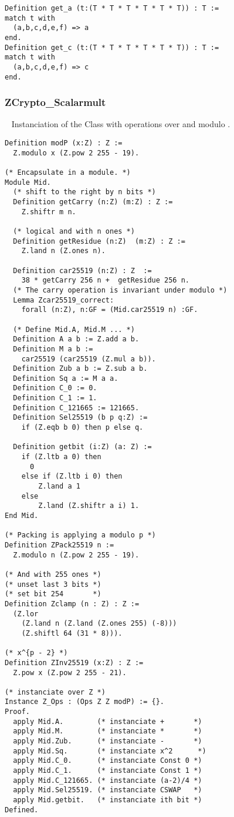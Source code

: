 \begin{lstlisting}[language=Coq]
Definition get_a (t:(T * T * T * T * T * T)) : T :=
match t with
  (a,b,c,d,e,f) => a
end.
Definition get_c (t:(T * T * T * T * T * T)) : T :=
match t with
  (a,b,c,d,e,f) => c
end.
\end{lstlisting}

\subsubsection{ZCrypto\_Scalarmult}
\label{subsubsec:ZCryptoScalarmult}
~
Instanciation of the Class  with operations over \Z and modulo \p.
\begin{lstlisting}[language=Coq]
Definition modP (x:Z) : Z :=
  Z.modulo x (Z.pow 2 255 - 19).

(* Encapsulate in a module. *)
Module Mid.
  (* shift to the right by n bits *)
  Definition getCarry (n:Z) (m:Z) : Z :=
    Z.shiftr m n.

  (* logical and with n ones *)
  Definition getResidue (n:Z)  (m:Z) : Z :=
    Z.land n (Z.ones n).

  Definition car25519 (n:Z) : Z  :=
    38 * getCarry 256 n +  getResidue 256 n.
  (* The carry operation is invariant under modulo *)
  Lemma Zcar25519_correct:
    forall (n:Z), n:GF = (Mid.car25519 n) :GF.

  (* Define Mid.A, Mid.M ... *)
  Definition A a b := Z.add a b.
  Definition M a b :=
    car25519 (car25519 (Z.mul a b)).
  Definition Zub a b := Z.sub a b.
  Definition Sq a := M a a.
  Definition C_0 := 0.
  Definition C_1 := 1.
  Definition C_121665 := 121665.
  Definition Sel25519 (b p q:Z) :=
    if (Z.eqb b 0) then p else q.

  Definition getbit (i:Z) (a: Z) :=
    if (Z.ltb a 0) then
      0
    else if (Z.ltb i 0) then
        Z.land a 1
    else
        Z.land (Z.shiftr a i) 1.
End Mid.

(* Packing is applying a modulo p *)
Definition ZPack25519 n :=
  Z.modulo n (Z.pow 2 255 - 19).

(* And with 255 ones *)
(* unset last 3 bits *)
(* set bit 254       *)
Definition Zclamp (n : Z) : Z :=
  (Z.lor
    (Z.land n (Z.land (Z.ones 255) (-8)))
    (Z.shiftl 64 (31 * 8))).

(* x^{p - 2} *)
Definition ZInv25519 (x:Z) : Z :=
  Z.pow x (Z.pow 2 255 - 21).

(* instanciate over Z *)
Instance Z_Ops : (Ops Z Z modP) := {}.
Proof.
  apply Mid.A.        (* instanciate +       *)
  apply Mid.M.        (* instanciate *       *)
  apply Mid.Zub.      (* instanciate -       *)
  apply Mid.Sq.       (* instanciate x^2      *)
  apply Mid.C_0.      (* instanciate Const 0 *)
  apply Mid.C_1.      (* instanciate Const 1 *)
  apply Mid.C_121665. (* instanciate (a-2)/4 *)
  apply Mid.Sel25519. (* instanciate CSWAP   *)
  apply Mid.getbit.   (* instanciate ith bit *)
Defined.


\end{lstlisting}
